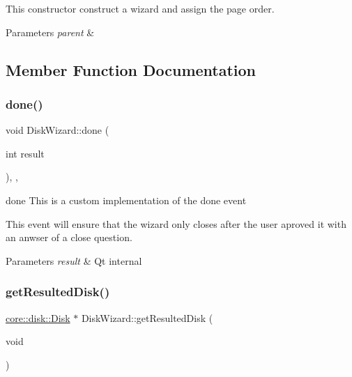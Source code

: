 This constructor construct a wizard and assign the page order. 
\begin{DoxyParams}{Parameters}
{\em parent} & \\
\hline
\end{DoxyParams}


\subsection{Member Function Documentation}
\mbox{\label{classui_1_1wizard_1_1_disk_wizard_aa0569c57c5568c9b03bbae99661f11ac}} 
\subsubsection{\texorpdfstring{done()}{done()}}
{\footnotesize\ttfamily void Disk\+Wizard\+::done (\begin{DoxyParamCaption}\item[{int}]{result }\end{DoxyParamCaption})\hspace{0.3cm}{\ttfamily [override]}, {\ttfamily [protected]}, {\ttfamily [virtual]}}



done This is a custom implementation of the done event 

This event will ensure that the wizard only closes after the user aproved it with an anwser of a close question. 
\begin{DoxyParams}{Parameters}
{\em result} & Qt internal \\
\hline
\end{DoxyParams}
\mbox{\label{classui_1_1wizard_1_1_disk_wizard_ae62aaaaa962e9cac555928bf84579e8f}} 
\subsubsection{\texorpdfstring{get\+Resulted\+Disk()}{getResultedDisk()}}
{\footnotesize\ttfamily \mbox{\hyperlink{classcore_1_1disk_1_1_disk}{core\+::disk\+::\+Disk}} $\ast$ Disk\+Wizard\+::get\+Resulted\+Disk (\begin{DoxyParamCaption}\item[{void}]{ }\end{DoxyParamCaption})}



